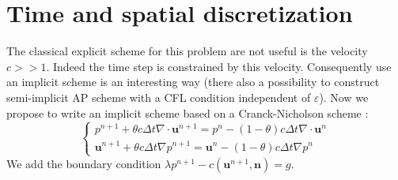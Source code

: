 \documentclass[a4paper,twoside,french,english,11pt]{article}
\newcommand{\ds}{\displaystyle}
\newcommand{\eps}{\varepsilon}
\begin{document}
\section{Time and spatial discretization}
The classical explicit scheme for this problem are not useful is the velocity $c>>1$. Indeed the time step is constrained by this velocity. Consequently use an implicit scheme is an interesting way (there also a possibility to construct semi-implicit AP scheme with a CFL condition independent of $\eps$). Now we propose to write an implicit scheme based on a Cranck-Nicholson scheme :
$$
\left\{\begin{array}{l}
\ds p^{n+1} + \theta c\Delta t \nabla \cdot \mathbf{u}^{n+1}=  p^n- (1-\theta) c \Delta t   \nabla \cdot \mathbf{u}^{n}\\
\ds \mathbf{u}^{n+1}+\theta c \Delta t \nabla p^{n+1}= \mathbf{u}^n-(1-\theta ) c\Delta t \nabla p^{n}\end{array}\right.
$$
We add the boundary condition $ \lambda  p^{n+1}-c(\bm{u}^{n+1},\bm{n})=g$.
\end{document}
